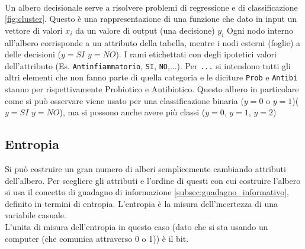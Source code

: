 \\Un albero decisionale serve a risolvere problemi di regressione e di classificazione \ref{fig:cluster}. Questo è una rappresentazione di una funzione
che dato in input un vettore di valori $x_i$ da un valore di output (una decisione) $y_i$ 
Ogni nodo interno all'albero corrisponde a un attributo della tabella, mentre i nodi esterni (foglie) a delle decisioni ($y=SI$ $y=NO$). 
I rami etichettati con degli ipotetici valori dell'attributo (Es. \texttt{Antinfiammatorio}, \texttt{SI}, \texttt{NO},...). Per \texttt{...} si intendono tutti gli altri 
elementi che non fanno parte di quella categoria e le diciture \texttt{Prob} e \texttt{Antibi} stanno per rispettivamente 
Probiotico e Antibiotico. Questo albero in particolare come si può osservare viene usato per una classificazione binaria ($y=0$ o $y=1$)($y=SI$ $y=NO$), ma si possono anche avere più classi ($y=0$, $y=1$, $y=2$) 
\subsection{Entropia}
\label{subsec:entropia}
Si può costruire un gran numero di alberi semplicemente cambiando attributi dell'albero. Per scegliere gli attributi e l'ordine di questi con cui costruire l'albero si usa il concetto
di guadagno di informazione \ref{subsec:guadagno_informativo}, definito in termini di entropia. L'entropia è la misura dell'incertezza di una variabile casuale.\\
L'unita di misura dell'entropia in questo caso (dato che si sta usando un computer (che comunica attraverso 0 o 1)) è il bit.

